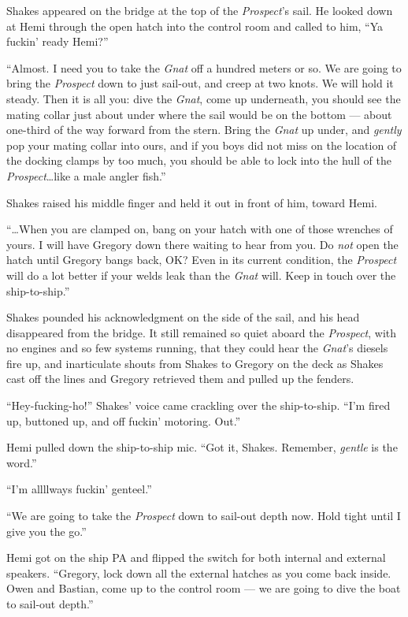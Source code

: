 \documentclass[
]{scrbook}
\begin{document}
Shakes appeared on the bridge at the top of the \emph{Prospect}'s sail.
He looked down at Hemi through the open hatch into the control room and
called to him, ``Ya fuckin' ready Hemi?''

``Almost. I need you to take the \emph{Gnat} off a hundred meters or so.
We are going to bring the \emph{Prospect} down to just sail-out, and
creep at two knots. We will hold it steady. Then it is all you: dive the
\emph{Gnat}, come up underneath, you should see the mating collar just
about under where the sail would be on the bottom --- about one-third of
the way forward from the stern. Bring the \emph{Gnat} up under, and
\emph{gently} pop your mating collar into ours, and if you boys did not
miss on the location of the docking clamps by too much, you should be
able to lock into the hull of the \emph{Prospect}\ldots like a male
angler fish.''

Shakes raised his middle finger and held it out in front of him, toward
Hemi.

``\ldots When you are clamped on, bang on your hatch with one of those
wrenches of yours. I will have Gregory down there waiting to hear from
you. Do \emph{not} open the hatch until Gregory bangs back, OK? Even in
its current condition, the \emph{Prospect} will do a lot better if your
welds leak than the \emph{Gnat} will. Keep in touch over the
ship-to-ship.''

Shakes pounded his acknowledgment on the side of the sail, and his head
disappeared from the bridge. It still remained so quiet aboard the
\emph{Prospect}, with no engines and so few systems running, that they
could hear the \emph{Gnat}'s diesels fire up, and inarticulate shouts
from Shakes to Gregory on the deck as Shakes cast off the lines and
Gregory retrieved them and pulled up the fenders.

``Hey-fucking-ho!'' Shakes' voice came crackling over the ship-to-ship.
``I'm fired up, buttoned up, and off fuckin' motoring. Out.''

Hemi pulled down the ship-to-ship mic. ``Got it, Shakes. Remember,
\emph{gentle} is the word.''

``I'm allllways fuckin' genteel.''

``We are going to take the \emph{Prospect} down to sail-out depth now.
Hold tight until I give you the go.''

Hemi got on the ship PA and flipped the switch for both internal and
external speakers. ``Gregory, lock down all the external hatches as you
come back inside. Owen and Bastian, come up to the control room --- we
are going to dive the boat to sail-out depth.''
\end{document}
